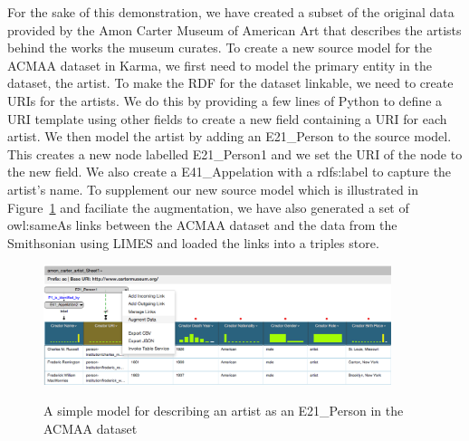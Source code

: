 For the sake of this demonstration, we have created a subset of the original data provided by the Amon Carter Museum of American Art that describes the artists behind the works the museum curates.  
To create a new source model for the ACMAA dataset in Karma, we first need to model the primary entity in the dataset, the artist.  To make the RDF for the dataset linkable, we need to create URIs for the artists.  
We do this by providing a few lines of Python to define a URI template using other fields to create a new field containing a URI for each artist.  We then model the artist by adding an E21\_Person to the source model.  
This creates a new node labelled E21\_Person1 and we set the URI of the node to the new field.  
We also create a E41\_Appelation with a rdfs:label to capture the artist's name.  
To supplement our new source model which is illustrated in Figure~\ref{fig:simple-model-screenshot} and faciliate the augmentation, we have also generated a set of owl:sameAs links between the ACMAA dataset and the data from the Smithsonian using LIMES and loaded the links into a triples store.  


\begin{figure}
\begin{center}
\includegraphics[width=4.0in]{4-simple-model.png}
\vspace{-3mm}
\caption{A simple model for describing an artist as an E21\_Person in the ACMAA dataset}
\vspace{-2mm}
\label{fig:simple-model-screenshot}
\end{center}
\vspace{-1.5em}
\end{figure}


